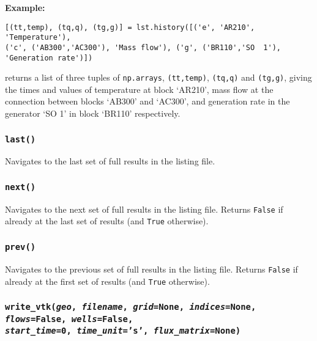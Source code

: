 \textbf{Example:}

\begin{lstlisting}
[(tt,temp), (tq,q), (tg,g)] = lst.history([('e', 'AR210', 'Temperature'),
('c', ('AB300','AC300'), 'Mass flow'), ('g', ('BR110','SO  1'), 'Generation rate')])
\end{lstlisting}

returns a list of three tuples of \texttt{np.arrays}, \texttt{(tt,temp)}, \texttt{(tq,q)} and \texttt{(tg,g)}, giving the times and values of temperature at block `AR210', mass flow at the connection between blocks `AB300' and `AC300', and generation rate in the generator `SO  1' in block `BR110' respectively.

\begin{snugshade}
\subsubsection{\texttt{last()}}
\end{snugshade}
\label{sec:t2listing:last}

Navigates to the last set of full results in the listing file.

\begin{snugshade}
\subsubsection{\texttt{next()}}
\end{snugshade}
\label{sec:t2listing:next}

Navigates to the next set of full results in the listing file.  Returns \texttt{False} if already at the last set of results (and \texttt{True} otherwise).

\begin{snugshade}
\subsubsection{\texttt{prev()}}
\end{snugshade}
\label{sec:t2listing:prev}

Navigates to the previous set of full results in the listing file.  Returns \texttt{False} if already at the first set of results (and \texttt{True} otherwise).

\begin{snugshade}
\subsubsection{\texttt{write\_vtk(\emph{geo}, \emph{filename}, \emph{grid}=None, \emph{indices}=None, \emph{flows}=False,
\emph{wells}=False,\\
\emph{start\_time}=0, \emph{time\_unit}='s', \emph{flux\_matrix}=None)}}
\end{snugshade}
\label{sec:t2listing:write_vtk}

